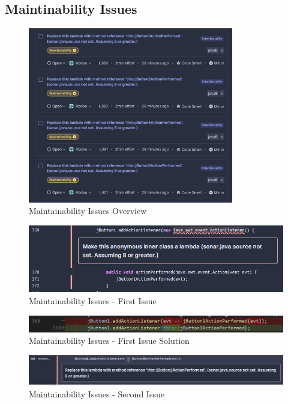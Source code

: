 \documentclass[12pt,a4paper]{article}
\begin{document}
\subsection{Maintinability Issues}
\begin{figure}[H]
    \centering
    \includegraphics[width=0.8\textwidth]{AbdouPhotos/Maintainability/MaintainabilityOverview.png}
    \caption{Maintainability Issues Overview}
    \label{fig:40I}
\end{figure}
\begin{figure}[H]
    \centering
    \includegraphics[width=1\textwidth]{AbdouPhotos/Maintainability/jButton1.png}
    \caption{Maintainability Issues - First Issue}
    \label{fig:MI-1st}
\end{figure}
\begin{figure}[H]
    \centering
    \includegraphics[width=1\textwidth]{AbdouPhotos/Maintainability/jButton1Solution.png}
    \caption{Maintainability Issues - First Issue Solution}
    \label{fig:MI-1stS}
\end{figure}
\begin{figure}[H]
    \centering
    \includegraphics[width=1\textwidth]{AbdouPhotos/Maintainability/jButton2.png}
    \caption{Maintainability Issues - Second Issue}
    \label{fig:MI-2nd}
\end{figure}
\end{document}

